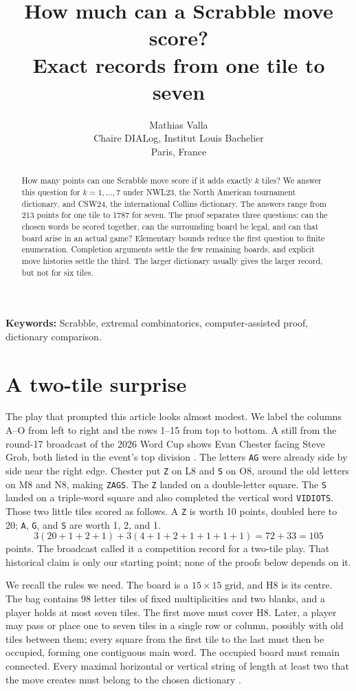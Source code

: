 \documentclass{article}
\title{How much can a Scrabble move score?\\Exact records from one tile to seven}
\author{Mathias Valla\\
  Chaire DIALog, Institut Louis Bachelier\\
  Paris, France}
\author{}
\date{}
\theoremstyle{plain}
\newcommand{\word}[1]{\texttt{#1}}
\begin{document}
\maketitle
\begin{abstract}
How many points can one Scrabble move score if it adds exactly $k$ tiles? We
answer this question for $k=1,\ldots,7$ under NWL23, the North American
tournament dictionary, and CSW24, the international Collins dictionary. The
answers range from 213 points for one tile to 1787 for seven. The proof
separates three questions: can the chosen words be scored together, can the
surrounding board be legal, and can that board arise in an actual game?
Elementary bounds reduce the first question to finite enumeration. Completion
arguments settle the few remaining boards, and explicit move histories settle
the third. The larger dictionary usually gives the larger record, but not for
six tiles.
\end{abstract}
\noindent\textbf{Keywords:} Scrabble, extremal combinatorics,
computer-assisted proof, dictionary comparison.

\section{A two-tile surprise}

The play that prompted this article looks almost modest. We label the columns
A--O from left to right and the rows 1--15 from top to bottom. A still from the
round-17 broadcast of the 2026 Word Cup shows Evan Chester facing Steve Grob,
both listed in the event's top division \cite{wordcup}. The letters \word{AG}
were already side by side near the right edge. Chester put \word{Z} on L8 and
\word{S} on O8, around the old letters on M8 and N8, making \word{ZAGS}. The
\word{Z} landed on a double-letter square. The \word{S} landed on a triple-word
square and also completed the vertical word \word{VIDIOTS}. Those two little
tiles scored as follows. A \word{Z} is worth 10 points, doubled here to 20;
\word{A}, \word{G}, and \word{S} are worth 1, 2, and 1.
\[
  3(20+1+2+1)+3(4+1+2+1+1+1+1)=72+33=105
\]
points. The broadcast called it a competition record for a two-tile play. That
historical claim is only our starting point; none of the proofs below depends
on it.

We recall the rules we need. The board is a $15\times15$ grid, and H8 is its centre.
The bag contains 98 letter tiles of fixed multiplicities and two blanks, and a
player holds at most seven tiles. The first move must cover H8. Later, a player
may pass or place one to seven tiles in a single row or column, possibly with
old tiles between them; every square from the first tile to the last must then
be occupied, forming one contiguous main word. The occupied board must remain connected. Every
maximal horizontal or vertical string of length at least two that the move
creates must belong to the chosen dictionary \cite{rules}.
\end{document}
